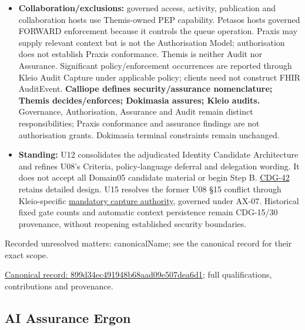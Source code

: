 \begin{itemize}


\item \textbf{Collaboration/exclusions:} governed access, activity, publication and
  collaboration hosts use Themis-owned PEP capability. Petasos hosts governed
  FORWARD enforcement because it controls the queue operation. Praxis may supply
  relevant context but is not the Authorisation Model; authorisation does not
  establish Praxis conformance. Themis is neither Audit nor Assurance. Significant
  policy/enforcement occurrences are reported through Kleio Audit Capture under
  applicable policy; clients need not construct FHIR AuditEvent.
  \textbf{Calliope defines security/assurance nomenclature; Themis decides/enforces;
  Dokimasia assures; Kleio audits.} Governance, Authorisation, Assurance and Audit
  remain distinct responsibilities; Praxis conformance and assurance findings
  are not authorisation grants. Dokimasia terminal constraints remain unchanged.

\item \textbf{Standing:} U12 consolidates the adjudicated Identity Candidate Architecture
  and refines U08's Criteria, policy-language deferral and delegation wording.
  It does not accept all Domain05 candidate material or begin Step B.
  \href{\detokenize{../../../../../docs/markdown/05-information-systems-architecture/gaps.md#themis-detailed-contracts}}{CDG-42} retains detailed design.
  U15 resolves the former U08 §15 conflict through Kleio-specific
  \href{\detokenize{../../../../../docs/markdown/05-information-systems-architecture/component-register.md#kleio-capture-authority}}{mandatory capture authority}, governed under AX-07.
  Historical fixed gate counts and automatic context persistence remain
  CDG-15/30 provenance, without reopening established security boundaries.

\end{itemize}

{\small Recorded unresolved matters: canonicalName; see the canonical record for their exact scope.}\par
{\footnotesize \href{../../../../continuum/application/application-component/899d34ec491948b68aad09e507dea6d1.md}{Canonical record: 899d34ec491948b68aad09e507dea6d1}; full qualifications, contributions and provenance.}\par
\subsection{AI Assurance Ergon}

